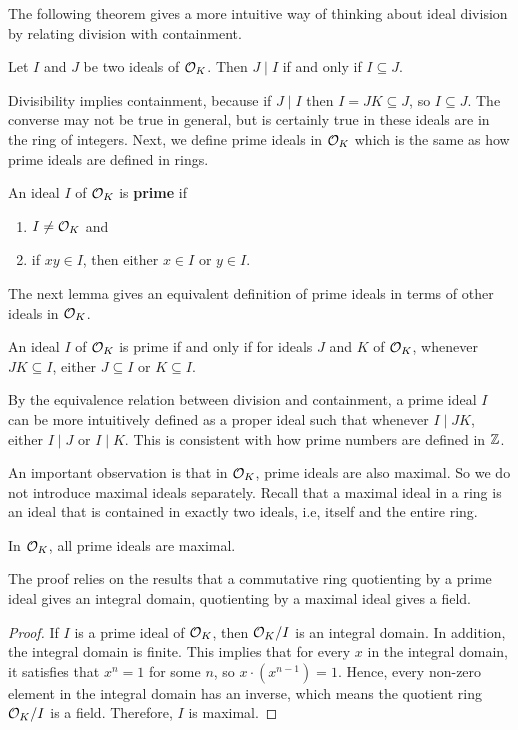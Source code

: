 \documentclass[../main.tex]{subfiles}
\begin{document}
The following theorem gives a more intuitive way of thinking about ideal division by relating division with containment. 

\begin{theorem}
\label{app thm:divCont}
\reversemarginpar
{}
Let $I$ and $J$ be two ideals of $\mathcal{O}_K$. Then $J \mid I$ if and only if $I \subseteq J$. 
\end{theorem}
Divisibility implies containment, because if $J\mid I$ then $I=JK\subseteq J$, so $I\subseteq J$. The converse may not be true in general, but is certainly true in these ideals are in the ring of integers. Next, we define prime ideals in $\mathcal{O}_K$ which is the same as how prime ideals are defined in rings. 

\begin{definition}
\reversemarginpar
{}
An ideal $I$ of $\mathcal{O}_K$ is \textbf{prime} if  
\begin{enumerate}
	\item $I \neq \mathcal{O}_K$ and 
	\item if $xy \in I$, then either $x \in I$ or $y \in I$. 
\end{enumerate}
\end{definition}

The next lemma gives an equivalent definition of prime ideals in terms of other ideals in $\mathcal{O}_K$. 
\begin{lemma}
An ideal $I$ of $\mathcal{O}_K$ is prime if and only if for ideals $J$ and $K$ of $\mathcal{O}_K$, whenever $JK \subseteq I$, either $J \subseteq I$ or $K \subseteq I$. 
\end{lemma}
By the equivalence relation between division and containment, a prime ideal $I$ can be more intuitively defined as a proper ideal such that whenever $I \mid JK$, either $I \mid J$ or $I \mid K$. This is consistent with how prime numbers are defined in $\mathbb{Z}$.  

An important observation is that in $\mathcal{O}_K$, prime ideals are also maximal. So we do not introduce maximal ideals separately. Recall that a maximal ideal in a ring is an ideal that is contained in exactly two ideals, i.e, itself and the entire ring. 

\begin{lemma}
\label{app lm:primeIsMax}
\reversemarginpar
{}
In $\mathcal{O}_K$, all prime ideals are maximal. 
\end{lemma}
The proof relies on the results that a commutative ring quotienting by a prime ideal gives an integral domain, quotienting by a maximal ideal gives a field. 
\begin{proof}
If $I$ is a prime ideal of $\mathcal{O}_K$, then $\mathcal{O}_K / I$ is an integral domain. In addition, the integral domain is finite. This implies that for every $x$ in the integral domain, it satisfies that $x^n = 1$ for some $n$, so $x \cdot (x^{n-1}) = 1$. Hence, every non-zero element in the integral domain has an inverse, which means the quotient ring $\mathcal{O}_K / I$ is a field. Therefore, $I$ is maximal. 
\end{proof}
\end{document}
